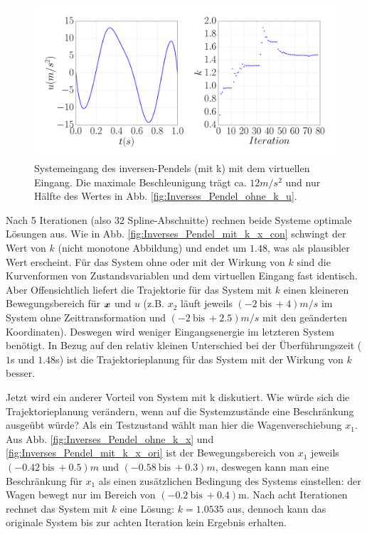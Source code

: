 \begin{beispiel}
	\begin{figure}[!h]
		\centering
		\includegraphics[width=0.7\linewidth]{bild/30_32/example0_mit_k_u_ori.pdf}%
		\caption[Systemeingang des inversen-Pendels (mit k) mit dem virtuellen Eingang.]{Systemeingang des inversen-Pendels (mit k) mit dem virtuellen Eingang. Die maximale Beschleunigung trägt ca. $12m/s^{2}$ und nur Hälfte des Wertes in Abb. \ref{fig:Inverses_Pendel_ohne_k_u}.}
		\label{fig:Inverses_Pendel_mit_k_u_ori}
	\end{figure}
	
	Nach 5 Iterationen (also 32 Spline-Abschnitte) rechnen beide Systeme optimale Lösungen aus. Wie in Abb. \ref{fig:Inverses_Pendel_mit_k_x_con} schwingt der Wert von $k$ (nicht monotone Abbildung) und endet um $1.48$, was als plausibler Wert erscheint. Für das System ohne oder mit der Wirkung von $k$ sind die Kurvenformen von Zustandsvariablen und dem virtuellen Eingang fast identisch. Aber Offensichtlich liefert die Trajektorie für das System mit $k$ einen kleineren Bewegungsbereich für $\boldsymbol x$ und $u$ (z.B. $x_{2}$ läuft jeweils $(-2~\text{bis}~+4)m/s$ im System ohne Zeittransformation und $(-2~\text{bis}~+2.5)m/s$ mit den geänderten Koordinaten). Deswegen wird weniger Eingangsenergie im letzteren System benötigt. In Bezug auf den relativ kleinen Unterschied bei der Überführungszeit ($1$s und $1.48$s) ist die Trajektorieplanung für das System mit der Wirkung von $k$ besser.
	
	Jetzt wird ein anderer Vorteil von System mit k diskutiert. Wie würde sich die Trajektorieplanung verändern, wenn auf die Systemzustände eine Beschränkung ausgeübt würde? Als ein Testzustand wählt man hier die Wagenverschiebung $x_{1}$. Aus Abb. \ref{fig:Inverses_Pendel_ohne_k_x} und \ref{fig:Inverses_Pendel_mit_k_x_ori} ist der Bewegungsbereich von $x_{1}$ jeweils $(-0.42~\text{bis}~+0.5)m$ und $(-0.58~\text{bis}~+0.3)m$, deswegen kann man eine Beschränkung für $x_{1}$ als einen zusätzlichen Bedingung des Systems einstellen: der Wagen bewegt nur im Bereich von $(-0.2~\text{bis}~+0.4)$m. Nach acht Iterationen rechnet das System mit $k$ eine Lösung: $k=1.0535$ aus, dennoch kann das originale System bis zur achten Iteration kein Ergebnis erhalten.
	

\end{beispiel}
